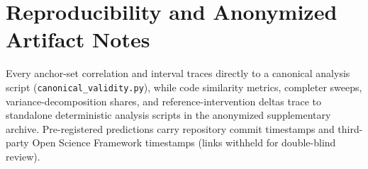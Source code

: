 \section{Reproducibility and Anonymized Artifact Notes}
\label{sec:supp-repro}

Every anchor-set correlation and interval traces directly to a canonical analysis script (\texttt{canonical\_validity.py}), while code similarity metrics, completer sweeps, variance-decomposition shares, and reference-intervention deltas trace to standalone deterministic analysis scripts in the anonymized supplementary archive.
Pre-registered predictions carry repository commit timestamps and third-party Open Science Framework timestamps (links withheld for double-blind review).
